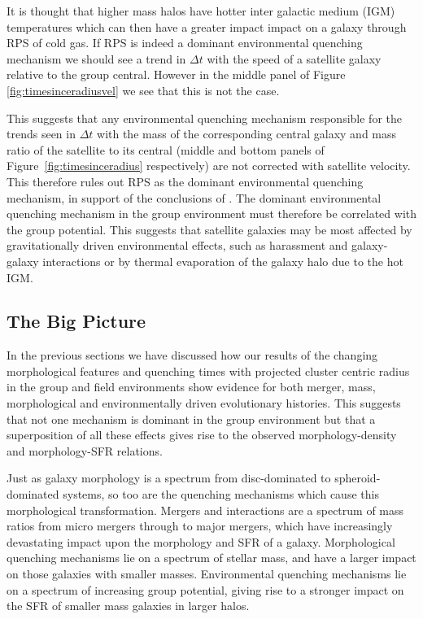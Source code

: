 \documentclass[useAMS,usenatbib]{mn2e}
\begin{document}
It is thought that higher mass halos have hotter inter galactic medium (IGM) temperatures which can then have a greater impact impact on a galaxy through RPS of cold gas. If RPS is indeed a dominant environmental quenching mechanism we should see a trend in $\Delta t$ with the speed of a satellite galaxy relative to the group central.  However in the middle panel of Figure \ref{fig:timesinceradiusvel} we see that this is not the case. 

This suggests that any environmental quenching mechanism responsible for the trends seen in $\Delta t$ with the mass of the corresponding central galaxy and mass ratio of the satellite to its central (middle and bottom panels of Figure~\ref{fig:timesinceradius} respectively) are not corrected with satellite velocity. This therefore rules out RPS as the dominant environmental quenching mechanism, in support of the conclusions of \citet{emerick16, fillingham16}.  The dominant environmental quenching mechanism in the group environment must therefore be correlated with the group potential. This suggests that satellite galaxies may be most affected by gravitationally driven environmental effects, such as harassment and galaxy-galaxy interactions or by thermal evaporation of the galaxy halo due to the hot IGM. 

\subsection{The Big Picture}\label{sec:bigpic}

In the previous sections we have discussed how our results of the changing morphological features and quenching times with projected cluster centric radius in the group and field environments show evidence for both merger, mass, morphological and environmentally driven evolutionary histories. This suggests that not one mechanism is dominant in the group environment but that a superposition of all these effects gives rise to the observed morphology-density and morphology-SFR relations.

Just as galaxy morphology is a spectrum from disc-dominated to spheroid-dominated systems, so too are the quenching mechanisms which cause this morphological transformation. Mergers and interactions are a spectrum of mass ratios from micro mergers \citep{carlin16} through to major mergers, which have increasingly devastating impact upon the morphology and SFR of a galaxy. Morphological quenching mechanisms lie on a spectrum of stellar mass, and have a larger impact on those galaxies with smaller masses. Environmental quenching mechanisms lie on a spectrum of increasing group potential, giving rise to a stronger impact on the SFR of smaller mass galaxies in larger halos.  
\end{document}
